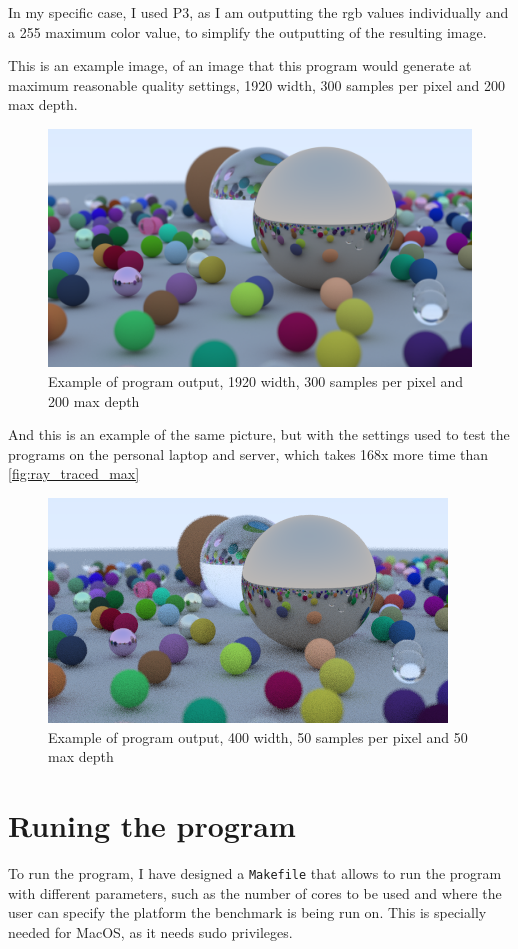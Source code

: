 In my specific case, I used P3, as I am outputting the \gls{rgb} values individually and a 255 maximum color value, to simplify the outputting of the resulting image.

This is an example image, of an image that this program would generate at maximum reasonable quality settings, 1920 width, 300 samples per pixel and 200 max depth.

\begin{figure}[h]
    \centering
    \includegraphics[width=0.65\linewidth]{img/ray_traced_balls.png}
    \caption{Example of program output, 1920 width, 300 samples per pixel and 200 max depth}
    \label{fig:ray_traced_max}
\end{figure}

And this is an example of the same picture, but with the settings used to test the programs on the personal laptop and server, which takes 168x more time than \autoref{fig:ray_traced_max}

\begin{figure}[h]
    \centering
    \includegraphics[width=0.65\linewidth]{img/regular_spheres_output.png}
    \caption{Example of program output, 400 width, 50 samples per pixel and 50 max depth}
    \label{fig:ray_traced_average}
\end{figure}

\section{Runing the program}
To run the program, I have designed a \texttt{Makefile} that allows to run the program with different parameters, such as the number of cores to be used and where the user can specify the platform the benchmark is being run on. This is specially needed for MacOS, as it needs \gls{sudo} privileges.

